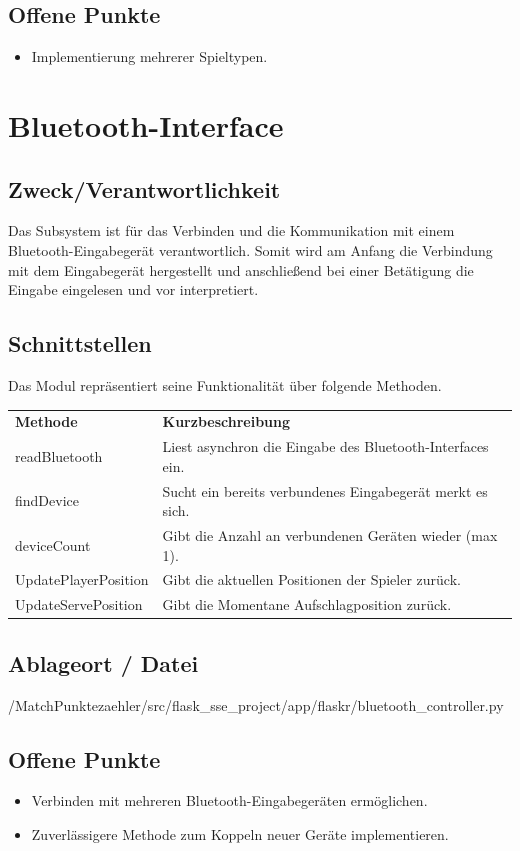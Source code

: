 \subsection*{Offene Punkte}
\begin{itemize}
	\item Implementierung mehrerer Spieltypen.
\end{itemize}

\section{Bluetooth-Interface}
\subsection*{Zweck/Verantwortlichkeit}
Das Subsystem ist für das Verbinden und die Kommunikation mit einem Bluetooth-Eingabegerät verantwortlich. Somit wird am Anfang die Verbindung mit dem Eingabegerät hergestellt und anschließend bei einer Betätigung die Eingabe eingelesen und vor interpretiert.
\subsection*{Schnittstellen}
Das Modul repräsentiert seine Funktionalität über folgende Methoden.
\begin{center}
\begin{tabular}[h]{|l|l|}
\cline{1-2}
\textbf{Methode} & \textbf{Kurzbeschreibung}\\
\cline{1-2}
readBluetooth & Liest asynchron die Eingabe des Bluetooth-Interfaces ein.\\ 
\cline{1-2}
findDevice & Sucht ein bereits verbundenes Eingabegerät merkt es sich.\\
\cline{1-2}
deviceCount & Gibt die Anzahl an verbundenen Geräten wieder (max 1).\\
\cline{1-2}
UpdatePlayerPosition & Gibt die aktuellen Positionen der Spieler zurück.\\
\cline{1-2} 
UpdateServePosition & Gibt die Momentane Aufschlagposition zurück.\\
\cline{1-2}\cline{1-2} 
\end{tabular}
\end{center}
\subsection*{Ablageort / Datei}
/MatchPunktezaehler/src/flask\_sse\_project/app/flaskr/bluetooth\_controller.py
\subsection*{Offene Punkte}
\begin{itemize}
	\item Verbinden mit mehreren Bluetooth-Eingabegeräten ermöglichen.
	\item Zuverlässigere Methode zum Koppeln neuer Geräte implementieren.
\end{itemize}
